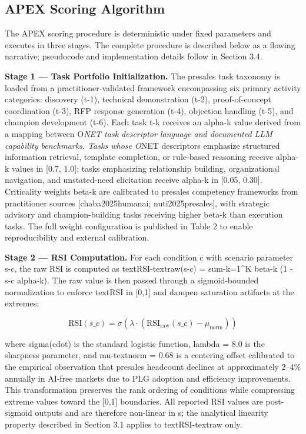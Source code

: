 \documentclass[10pt, conference]{IEEEtran}
\begin{document}
\subsection{APEX Scoring Algorithm}

\label{sec:apex\_scoring\_algorithm}

The APEX scoring procedure is deterministic under fixed parameters and executes in three stages. The complete procedure is described below as a flowing narrative; pseudocode and implementation details follow in Section 3.4.

\textbf{Stage 1 --- Task Portfolio Initialization.} The presales task taxonomy is loaded from a practitioner-validated framework encompassing six primary activity categories: discovery (t-1), technical demonstration (t-2), proof-of-concept coordination (t-3), RFP response generation (t-4), objection handling (t-5), and champion development (t-6). Each task t-k receives an alpha-k value derived from a mapping between O\textit{NET task descriptor language and documented LLM capability benchmarks. Tasks whose O}NET descriptors emphasize structured information retrieval, template completion, or rule-based reasoning receive alpha-k values in [0.7, 1.0]; tasks emphasizing relationship building, organizational navigation, and unstated-need elicitation receive alpha-k in [0.05, 0.30]. Criticality weights beta-k are calibrated to presales competency frameworks from practitioner sources [chaba2025humanai; nuti2025presales], with strategic advisory and champion-building tasks receiving higher beta-k than execution tasks. The full weight configuration is published in Table 2 to enable reproducibility and external calibration.

\textbf{Stage 2 --- RSI Computation.} For each condition c with scenario parameter s-c, the raw RSI is computed as textRSI-textraw(s-c) = sum-k=1^K beta-k (1 - s-c alpha-k). The raw value is then passed through a sigmoid-bounded normalization to enforce textRSI in [0,1] and dampen saturation artifacts at the extremes:

\begin{equation}
\text{RSI}(s\_c) = \sigma\!\left(\lambda \cdot \left(\text{RSI}_{\text{raw}}(s\_c) - \mu_{\text{norm}}\right)\right)
\end{equation}

where sigma(cdot) is the standard logistic function, lambda = 8.0 is the sharpness parameter, and mu-textnorm = 0.68 is a centering offset calibrated to the empirical observation that presales headcount declines at approximately 2--4\% annually in AI-free markets due to PLG adoption and efficiency improvements. This transformation preserves the rank ordering of conditions while compressing extreme values toward the [0,1] boundaries. All reported RSI values are post-sigmoid outputs and are therefore non-linear in s; the analytical linearity property described in Section 3.1 applies to textRSI-textraw only.
\end{document}

